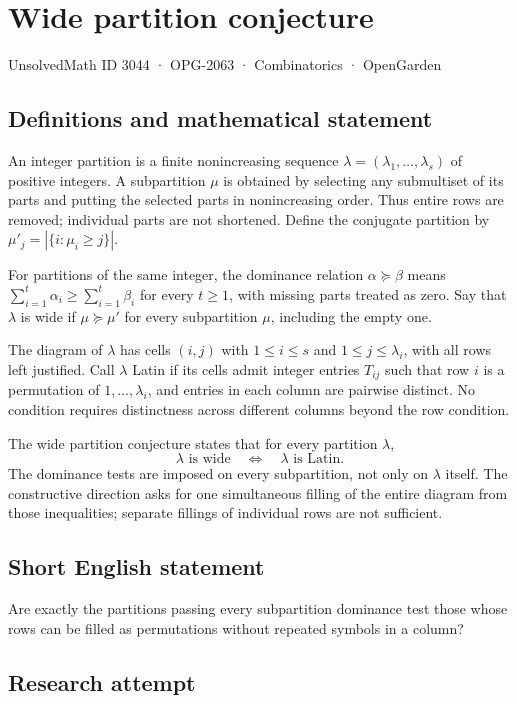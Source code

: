 \documentclass[11pt,a4paper]{article}
\begin{document}
\section*{Wide partition conjecture}\label{3044}
{\small UnsolvedMath ID 3044 · OPG-2063 · Combinatorics · OpenGarden}
\subsection{Definitions and mathematical statement}
An integer partition is a finite nonincreasing sequence
$\lambda=(\lambda_1,\ldots,\lambda_s)$ of positive integers.
A subpartition $\mu$ is obtained by selecting any submultiset of its parts
and putting the selected parts in nonincreasing order. Thus entire rows
are removed; individual parts are not shortened. Define the conjugate
partition by $\mu'_j=|\{i:\mu_i\ge j\}|$.

For partitions of the same integer, the dominance relation $\alpha\succeq\beta$
means $\sum_{i=1}^t\alpha_i\ge\sum_{i=1}^t\beta_i$ for every $t\ge1$,
with missing parts treated as zero. Say that $\lambda$ is wide if
$\mu\succeq\mu'$ for every subpartition $\mu$, including the empty one.

The diagram of $\lambda$ has cells $(i,j)$ with $1\le i\le s$ and
$1\le j\le\lambda_i$, with all rows left justified. Call $\lambda$ Latin
if its cells admit integer entries $T_{ij}$ such that row $i$ is a
permutation of $1,\ldots,\lambda_i$, and entries in each column are
pairwise distinct. No condition requires distinctness across different
columns beyond the row condition.

The wide partition conjecture states that for every partition $\lambda$,
\[
 \lambda\text{ is wide}\quad\Longleftrightarrow\quad
 \lambda\text{ is Latin}.
\]
The dominance tests are imposed on every subpartition, not only on
$\lambda$ itself. The constructive direction asks for one simultaneous
filling of the entire diagram from those inequalities; separate fillings
of individual rows are not sufficient.
\subsection{Short English statement}
Are exactly the partitions passing every subpartition dominance test those whose rows can be filled as permutations without repeated symbols in a column?
\subsection{Research attempt}
\end{document}
